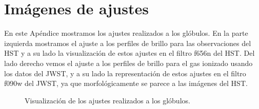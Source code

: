 \documentclass{book}
\begin{document}
\chapter{Imágenes de ajustes}\label{App : ajustes}

En este Apéndice mostramos los ajustes realizados a los glóbulos. En la parte izquierda mostramos el ajuste a los perfiles de brillo para las observaciones del HST y a su lado la visualización de estos ajustes en el filtro f656n del HST. Del lado derecho vemos el ajuste a los perfiles de brillo para el gas ionizado usando los datos del JWST, y a su lado la representación de estos ajustes en el filtro f090w del JWST, ya que morfológicamente se parece a las imágenes del HST.

\begin{figure}[htb]
    \centering
    \caption{Visualización de los ajustes realizados a los glóbulos.}
    \label{fig:ajuestes_apendice}
\end{figure}

\newpage


\newpage
\end{document}
